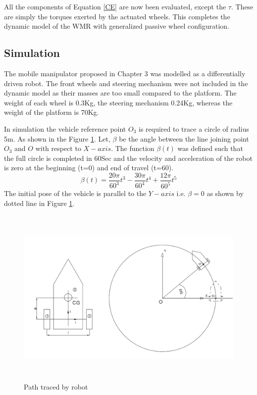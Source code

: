 All the components of  Equation  \ref{CE}  are now been evaluated, except the $\tau$. These are simply the torques exerted by the actuated wheels. This completes the dynamic model of the WMR with generalized passive wheel configuration.










\subsection{Simulation }
\label{sec: SimulationIdealCondition}
The mobile manipulator proposed in Chapter 3  was modelled as a differentially driven robot. The front wheels and steering mechanism were not included in the dynamic model as their masses are too small compared to the  platform. The weight of each wheel is 0.3Kg, the steering mechanism 0.24Kg, whereas the weight of the  platform is 70Kg.

In  simulation the vehicle reference  point $O_3$ is required to trace a circle of radius 5m. As shown in the Figure \ref{fig:CirTrace}. Let, $ \beta$ be the angle between the line joining  point $O_3$ and $O$ with respect to $X-axis$. The function $\beta(t)$ was defined such that the full circle is completed in 60Sec and the velocity and acceleration of the robot is zero at the beginning (t=0) and end of travel (t=60).
\begin{equation}
\label{path}
\beta(t)=\frac{20\pi}{60^3}t^3-\frac{30\pi}{60^4}t^4+\frac{12\pi}{60^5}t^5
\end{equation}
The initial pose of the vehicle is parallel to the $Y-axis$ i.e. $\beta=0$  as shown  by dotted line in Figure \ref{fig:CirTrace}.

\begin{figure}[H]
	\centering
		\includegraphics[height=250pt,keepaspectratio]{Chapter4/fig/pathCircle}
		\caption{Path traced by robot}
	\label{fig:CirTrace}
\end{figure}



